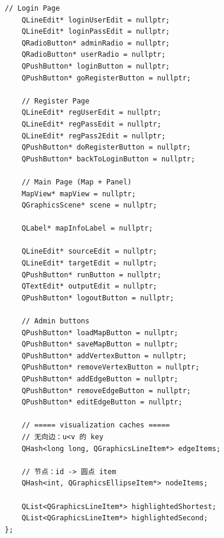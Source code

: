 \documentclass[UTF8,12pt,a4paper]{ctexart}
\begin{document}
\begin{lstlisting}[caption={mainwindow.h 源码}]
    // Login Page
    QLineEdit* loginUserEdit = nullptr;
    QLineEdit* loginPassEdit = nullptr;
    QRadioButton* adminRadio = nullptr;
    QRadioButton* userRadio = nullptr;
    QPushButton* loginButton = nullptr;
    QPushButton* goRegisterButton = nullptr;

    // Register Page
    QLineEdit* regUserEdit = nullptr;
    QLineEdit* regPassEdit = nullptr;
    QLineEdit* regPass2Edit = nullptr;
    QPushButton* doRegisterButton = nullptr;
    QPushButton* backToLoginButton = nullptr;

    // Main Page (Map + Panel)
    MapView* mapView = nullptr;
    QGraphicsScene* scene = nullptr;

    QLabel* mapInfoLabel = nullptr;

    QLineEdit* sourceEdit = nullptr;
    QLineEdit* targetEdit = nullptr;
    QPushButton* runButton = nullptr;
    QTextEdit* outputEdit = nullptr;
    QPushButton* logoutButton = nullptr;

    // Admin buttons
    QPushButton* loadMapButton = nullptr;
    QPushButton* saveMapButton = nullptr;
    QPushButton* addVertexButton = nullptr;
    QPushButton* removeVertexButton = nullptr;
    QPushButton* addEdgeButton = nullptr;
    QPushButton* removeEdgeButton = nullptr;
    QPushButton* editEdgeButton = nullptr;

    // ===== visualization caches =====
    // 无向边：u<v 的 key
    QHash<long long, QGraphicsLineItem*> edgeItems;

    // 节点：id -> 圆点 item
    QHash<int, QGraphicsEllipseItem*> nodeItems;

    QList<QGraphicsLineItem*> highlightedShortest;
    QList<QGraphicsLineItem*> highlightedSecond;
};

\end{lstlisting}
\end{document}
